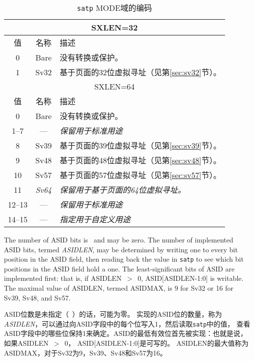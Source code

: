 \begin{table}[h]
\begin{center}
\begin{tabular}{|c|c|l|}
\hline
\multicolumn{3}{|c|}{SXLEN=32} \\
\hline
值  & 名称 & 描述 \\
\hline
0       & Bare  & 没有转换或保护。 \\
1       & Sv32  & 基于页面的32位虚拟寻址（见第\ref{sec:sv32}节）。 \\
\hline \hline
\multicolumn{3}{|c|}{SXLEN=64} \\
\hline
值  & 名称 & 描述 \\
\hline
0       & Bare  & 没有转换或保护。 \\
1--7    & ---   & {\em 保留用于标准用途} \\
8       & Sv39  & 基于页面的39位虚拟寻址（见第\ref{sec:sv39}节）。 \\
9       & Sv48  & 基于页面的48位虚拟寻址（见第\ref{sec:sv48}节）。 \\
10      & Sv57  & 基于页面的57位虚拟寻址（见第\ref{sec:sv57}节）。 \\
11      & {\em Sv64} & {\em 保留用于基于页面的64位虚拟寻址。} \\
12--13  & ---   & {\em 保留用于标准用途} \\
14--15  & ---   & {\em 指定用于自定义用途} \\
\hline
\end{tabular}
\end{center}
\caption{{\tt satp} MODE域的编码}
\label{tab:satp-mode}
\end{table}

The number of ASID bits is \unspecified\ and may be zero.  The
number of implemented ASID bits, termed {\mbox {\em ASIDLEN}}, may be
determined by writing one to every bit position in the ASID field, then
reading back the value in {\tt satp} to see which bit positions in the ASID
field hold a one.  The least-significant bits of ASID are implemented first:
that is, if ASIDLEN~$>$~0, ASID[ASIDLEN-1:0] is writable.  The maximal value
of ASIDLEN, termed ASIDMAX, is 9 for Sv32 or 16 for Sv39, Sv48, and Sv57.

ASID位数是未指定（\unspecified\ ）的话，可能为零。
实现的ASID位的数量，称为{\mbox {\em ASIDLEN}}，可以通过向ASID字段中的每个位写入1，然后读取{\tt satp}中的值，
查看ASID字段中的哪些位保持1来确定。ASID的最低有效位首先被实现：也就是说，
如果ASIDLEN~$>$~0， ASID[ASIDLEN-1:0]是可写的。
ASIDLEN的最大值称为ASIDMAX，对于Sv32为9，Sv39、Sv48和Sv57为16。

